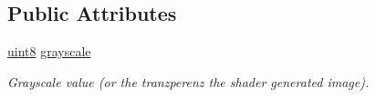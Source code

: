 \subsection*{Public Attributes}
\begin{DoxyCompactItemize}
\item 
\hypertarget{class_f2_c_1_1_color_tone_a563a24af834bcd125e75b69d72b4352d}{
\hyperlink{namespace_f2_c_a711deb33697d145669b9c0c4fe87c7ca}{uint8} \hyperlink{class_f2_c_1_1_color_tone_a563a24af834bcd125e75b69d72b4352d}{grayscale}}
\label{class_f2_c_1_1_color_tone_a563a24af834bcd125e75b69d72b4352d}

\begin{DoxyCompactList}\small\item\em Grayscale value (or the tranzperenz the shader generated image). \item\end{DoxyCompactList}\end{DoxyCompactItemize}
